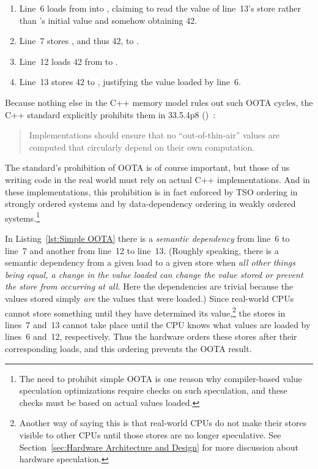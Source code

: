 \documentclass[10]{article}
\begin{document}
\begin{enumerate}
\item   Line~6 loads from  into , claiming to read
	the value of line~13's store rather than 's initial value
	and somehow obtaining 42.
\item   Line~7 stores , and thus 42, to .
\item   Line~12 loads 42 from  to .
\item   Line~13 stores 42 to , justifying the value loaded by line~6.
\end{enumerate}

Because nothing else in the C++ memory model rules out such OOTA cycles,
the C++ standard explicitly prohibits them in 33.5.4p8
()~\cite{ThomasKoeppe2023N4950}:
\begin{quote}
	Implementations should ensure that no “out-of-thin-air” values
	are computed that circularly depend on their own computation.
\end{quote}
The standard's prohibition of OOTA is of course important, but those of us
writing code in the real world must rely on actual C++ implementations.
And in these implementations, this prohibition is in fact enforced by TSO
ordering in strongly ordered systems and by data-dependency ordering in
weakly ordered systems.\footnote{
	The need to prohibit simple OOTA is one reason why compiler-based
	value speculation optimizations require checks on such
	speculation, and these checks must be based on actual values
	loaded.}

In Listing~\ref{lst:Simple OOTA}
there is a \emph{semantic dependency} from line~6 to line~7 and
another from line~12 to line~13.
(Roughly speaking, there is a semantic dependency from a given load
to a given store when \emph{all other things being equal, a change in the
value loaded can change the value stored or prevent the store from
occurring at all.}
Here the dependencies are trivial because the values stored simply
\emph{are} the values that were loaded.)
Since real-world CPUs cannot store something
until they have determined its value,\footnote{
	Another way of saying this is that real-world CPUs do not
	make their stores visible to other CPUs until those stores
	are no longer speculative.
	See Section~\ref{sec:Hardware Architecture and Design}
	for more discussion about hardware speculation.}
the stores in lines~7 and~13 cannot take place until the CPU
knows what values are loaded by lines~6 and~12, respectively.
Thus the hardware orders these stores after their corresponding loads,
and this ordering prevents the OOTA result.
\end{document}

